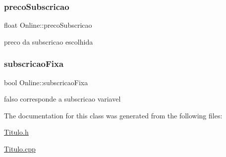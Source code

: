\subsubsection{\texorpdfstring{preco\+Subscricao}{precoSubscricao}}
{\footnotesize\ttfamily float Online\+::preco\+Subscricao\hspace{0.3cm}{\ttfamily [private]}}

preco da subscricao escolhida \mbox{\label{class_online_ada57c60b1e5fb9ce52ddd404d8fba0d8}} 
\subsubsection{\texorpdfstring{subscricao\+Fixa}{subscricaoFixa}}
{\footnotesize\ttfamily bool Online\+::subscricao\+Fixa\hspace{0.3cm}{\ttfamily [private]}}

falso corresponde a subscricao variavel 

The documentation for this class was generated from the following files\+:\begin{DoxyCompactItemize}
\item 
\mbox{\hyperlink{_titulo_8h}{Titulo.\+h}}\item 
\mbox{\hyperlink{_titulo_8cpp}{Titulo.\+cpp}}\end{DoxyCompactItemize}
